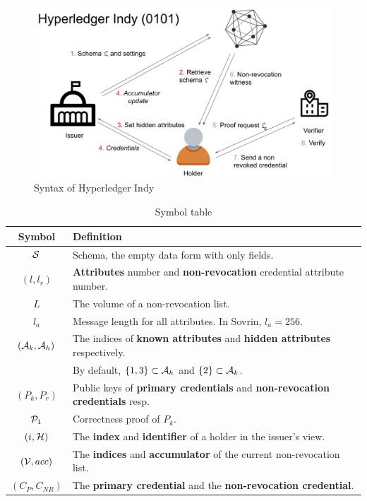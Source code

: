 \documentclass{article}
\begin{document}
\begin{figure}
	\includegraphics[width=\textwidth]{syntax.png}
	\caption{Syntax of Hyperledger Indy}
	\label{fig:indy}
\end{figure}

\begin{table}[h!]
\centering
\begin{tabular}{|c|l|} 
 \hline
 Symbol & Definition \\ \hline
 $\mathcal{S}$ & Schema, the empty data form with only fields. \\
 $(l, l_{r})$ & \textbf{Attributes} number and \textbf{non-revocation} credential attribute number. \\
 $L$ & The volume of a non-revocation list. \\
 $l_{a}$ & Message length for all attributes. In Sovrin, $l_{a}=256$. \\
 $(\mathcal{A}_{k}, \mathcal{A}_{h})$ & The indices of \textbf{known attributes} and \textbf{hidden attributes} respectively.  \\
 & By default, $\{1, 3\}\subset \mathcal{A}_{h}$ and $\{2\}\subset \mathcal{A}_{k} $. \\
 $(P_{k}, P_{r})$ & Public keys of \textbf{primary credentials} and \textbf{non-revocation credentials} resp.\\
 $\mathcal{P}_{1}$ & Correctness proof of $P_{k}$. \\
 $(i, \mathcal{H})$ & The \textbf{index} and \textbf{identifier} of a holder in the issuer's view. \\
 $(\mathcal{V}, acc)$ & The \textbf{indices} and \textbf{accumulator} of the current non-revocation list.\\ 
 $(C_{P}, C_{NR})$ & The \textbf{primary credential} and the \textbf{non-revocation credential}.\\ \hline
\end{tabular}
\caption{Symbol table}
\label{table:symbol}
\end{table}
\clearpage
\end{document}
